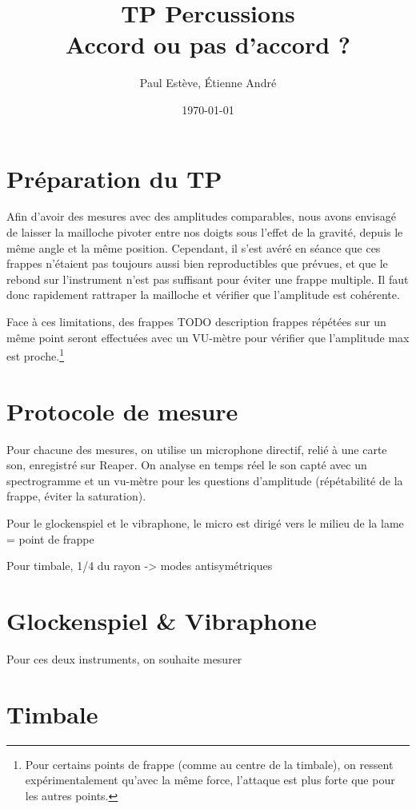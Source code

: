 \documentclass[atiam, article]{rapport} %
\title{TP Percussions\\Accord ou pas d'accord ?}
\author{Paul Estève, Étienne André} %
\date{\today}
\begin{document}
\maketitle

\section{Préparation du TP}

Afin d'avoir des mesures avec des amplitudes comparables, nous avons envisagé de laisser la mailloche pivoter entre nos doigts sous l'effet de la gravité, depuis le même angle et la même position. Cependant, il s'est avéré en séance que ces frappes n'étaient pas toujours aussi bien reproductibles que prévues, et que le rebond sur l'instrument n'est pas suffisant pour éviter une frappe multiple. Il faut donc rapidement rattraper la mailloche et vérifier que l'amplitude est cohérente.

Face à ces limitations, des frappes {\Large TODO description frappes}%
 répétées sur un même point seront effectuées avec un VU-mètre pour vérifier que l'amplitude max est proche.\footnote{Pour certains points de frappe (comme au centre de la timbale), on ressent expérimentalement qu'avec la même force, l'attaque est plus forte que pour les autres points.}

\section{Protocole de mesure}

Pour chacune des mesures, on utilise un microphone directif, relié à une carte son, enregistré sur Reaper. On analyse en temps réel le son capté avec un spectrogramme et un vu-mètre pour les questions d'amplitude (répétabilité de la frappe, éviter la saturation).

Pour le glockenspiel et le vibraphone, le micro est dirigé vers le milieu de la lame = point de frappe

Pour timbale, 1/4 du rayon -> modes antisymétriques

\section{Glockenspiel \& Vibraphone}

Pour ces deux instruments, on souhaite mesurer 



\section{Timbale}
\end{document}
